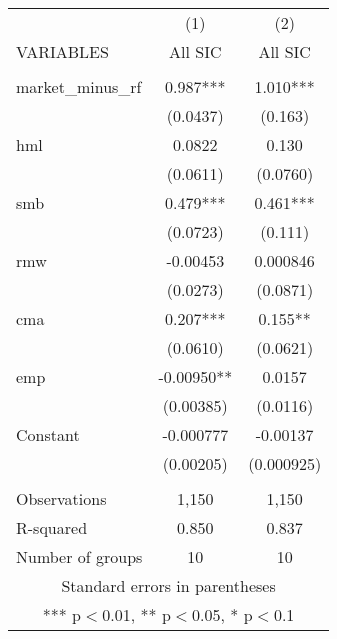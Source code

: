\begin{tabular}{lcc} \hline
 & (1) & (2) \\
VARIABLES & All SIC & All SIC \\ \hline
 &  &  \\
market\_minus\_rf & 0.987*** & 1.010*** \\
 & (0.0437) & (0.163) \\
hml & 0.0822 & 0.130 \\
 & (0.0611) & (0.0760) \\
smb & 0.479*** & 0.461*** \\
 & (0.0723) & (0.111) \\
rmw & -0.00453 & 0.000846 \\
 & (0.0273) & (0.0871) \\
cma & 0.207*** & 0.155** \\
 & (0.0610) & (0.0621) \\
emp & -0.00950** & 0.0157 \\
 & (0.00385) & (0.0116) \\
Constant & -0.000777 & -0.00137 \\
 & (0.00205) & (0.000925) \\
 &  &  \\
Observations & 1,150 & 1,150 \\
R-squared & 0.850 & 0.837 \\
 Number of groups & 10 & 10 \\ \hline
\multicolumn{3}{c}{ Standard errors in parentheses} \\
\multicolumn{3}{c}{ *** p$<$0.01, ** p$<$0.05, * p$<$0.1} \\
\end{tabular}

